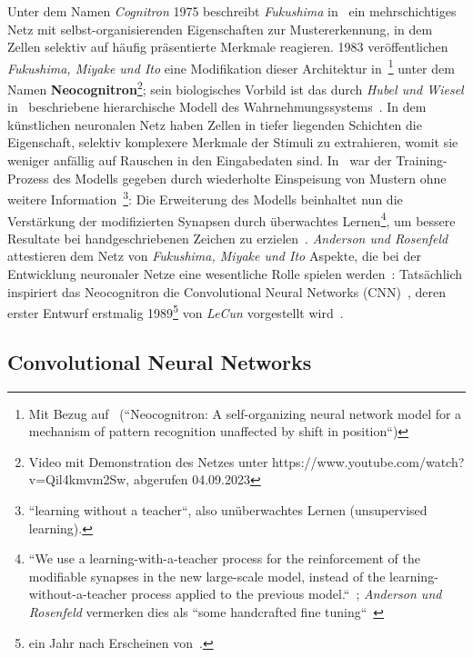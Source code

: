 Unter dem Namen \textit{Cognitron} 1975 beschreibt \textit{Fukushima} in~\cite{Fuk75} ein mehrschichtiges Netz mit selbst-organisierenden Eigenschaften zur Mustererkennung, in dem Zellen selektiv auf häufig präsentierte Merkmale reagieren.
1983 veröffentlichen \textit{Fukushima, Miyake und Ito} eine Modifikation dieser Architektur in~\cite{FMI83}\footnote{
    Mit Bezug auf~\cite{Fuk80} (``Neocognitron: A self-organizing neural network model for a mechanism of pattern recognition unaffected by shift in position``)
} unter dem Namen \textbf{Neocognitron}\footnote{
    Video mit Demonstration des Netzes unter https://www.youtube.com/watch?v=Qil4kmvm2Sw, abgerufen 04.09.2023
}; sein biologisches Vorbild ist das durch \textit{Hubel und Wiesel} in~\cite{HW62} beschriebene hierarchische Modell des Wahrnehmungssystems~\cite[827]{FMI83}.
In dem künstlichen neuronalen Netz haben Zellen in tiefer liegenden Schichten die Eigenschaft, selektiv komplexere Merkmale der Stimuli zu extrahieren, womit sie weniger anfällig auf Rauschen in den Eingabedaten sind.
In~\cite{Fuk80} war der Training-Prozess des Modells gegeben durch wiederholte Einspeisung von Mustern ohne weitere Information~\cite[197]{Fuk80}\footnote{
    ``learning without a teacher``, also unüberwachtes Lernen (unsupervised learning).
}: Die Erweiterung des Modells beinhaltet nun die Verstärkung der modifizierten Synapsen durch überwachtes Lernen\footnote{
    ``We use a learning-with-a-teacher process for the reinforcement of the modifiable synapses in the new large-scale
model, instead of the learning-without-a-teacher process applied to the previous model.``~\cite[827]{FMI83}; \textit{Anderson und Rosenfeld} vermerken dies als ``some handcrafted fine tuning``~\cite[524 f.]{AR88}
}, um bessere Resultate bei handgeschriebenen Zeichen zu erzielen~\cite[829]{FMI83}.
\textit{Anderson und Rosenfeld} attestieren dem Netz von \textit{Fukushima, Miyake und Ito} Aspekte, die bei der Entwicklung neuronaler Netze eine wesentliche Rolle spielen werden~\cite[524]{AR88}:  Tatsächlich inspiriert das Neocognitron die Convolutional Neural Networks (CNN)~\cite[439]{LBH15}, deren erster Entwurf erstmalig 1989\footnote{
    ein Jahr nach Erscheinen von~\cite{AR88}.
} von \textit{LeCun} vorgestellt wird~\cite{Cun89}.



\subsection{Convolutional Neural Networks}\label{cnn}

